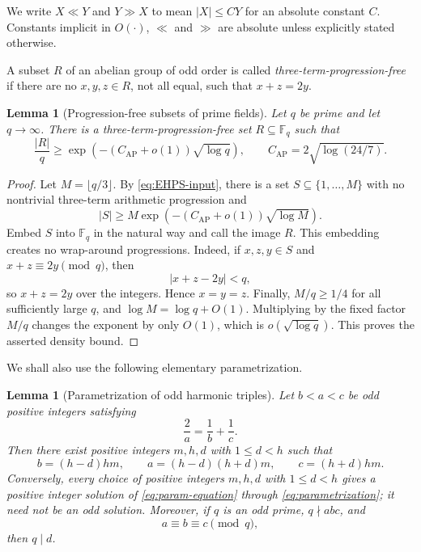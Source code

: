 \documentclass[11pt]{article}
\theoremstyle{plain}
\newtheorem{lemma}[theorem]{Lemma}
\theoremstyle{remark}
\newcommand{\F}{\mathbb F}
\newcommand{\AP}{\mathrm{AP}}
\begin{document}
We write $X\ll Y$ and $Y\gg X$ to mean $|X|\le C Y$ for an absolute constant $C$.  Constants implicit in $O(\cdot)$, $\ll$ and $\gg$ are absolute unless explicitly stated otherwise.

A subset $R$ of an abelian group of odd order is called \emph{three-term-progression-free} if there are no $x,y,z\in R$, not all equal, such that $x+z=2y$.

\begin{lemma}[Progression-free subsets of prime fields]\label{lem:finite-field-input}
Let $q$ be prime and let $q\to\infty$.  There is a three-term-progression-free set $R\subseteq\F_q$ such that
\[
  \frac{|R|}{q}\ge \exp\!\left(-(C_{\AP}+o(1))\sqrt{\log q}\right),
  \qquad C_{\AP}=2\sqrt{\log(24/7)} .
\]
\end{lemma}

\begin{proof}
Let $M=\lfloor q/3\rfloor$.  By \eqref{eq:EHPS-input}, there is a set $S\subseteq\{1,\ldots,M\}$ with no nontrivial three-term arithmetic progression and
\[
  |S|\ge M\exp\!\left(-(C_{\AP}+o(1))\sqrt{\log M}\right).
\]
Embed $S$ into $\F_q$ in the natural way and call the image $R$.  This embedding creates no wrap-around progressions.  Indeed, if $x,z,y\in S$ and $x+z\equiv 2y\pmod q$, then
\[
  |x+z-2y|<q,
\]
so $x+z=2y$ over the integers.  Hence $x=y=z$.  Finally, $M/q\ge 1/4$ for all sufficiently large $q$, and $\log M=\log q+O(1)$.  Multiplying by the fixed factor $M/q$ changes the exponent by only $O(1)$, which is $o(\sqrt{\log q})$.  This proves the asserted density bound.
\end{proof}

We shall also use the following elementary parametrization.

\begin{lemma}[Parametrization of odd harmonic triples]\label{lem:parametrization}
Let $b<a<c$ be odd positive integers satisfying
\begin{equation}\label{eq:param-equation}
  \frac2a=\frac1b+\frac1c .
\end{equation}
Then there exist positive integers $m,h,d$ with $1\le d<h$ such that
\begin{equation}\label{eq:parametrization}
  b=(h-d)hm,\qquad a=(h-d)(h+d)m,\qquad c=(h+d)hm .
\end{equation}
Conversely, every choice of positive integers $m,h,d$ with $1\le d<h$ gives a positive integer solution of \eqref{eq:param-equation} through \eqref{eq:parametrization}; it need not be an odd solution.  Moreover, if $q$ is an odd prime, $q\nmid abc$, and
\begin{equation}\label{eq:equal-congruence-param}
  a\equiv b\equiv c\pmod q,
\end{equation}
then $q\mid d$.
\end{lemma}
\end{document}
